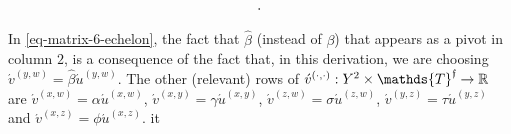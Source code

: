 \documentclass[12pt,a4paper,twoside]{article}
\newcommand{\novel}{\mathfrak f}
\newcommand{\mbbtp}{{\mathds{T}^\novel}}
\newcommand{\xy}{{(x, y)}}
\newcommand{\yz}{{(y,z)}}
\newcommand{\xz}{{(x,z)}}
\newcommand{\xw}{{(x,w)}}
\newcommand{\yw}{{(y,w)}}
\newcommand{\zw}{(z,w)}
\newcommand{\dd}{{(\cdot,\cdot)}}
\begin{document}
\begin{appendices}
\begin{linenomath*}
\begin{equation}
\begin{blockarray}{ccccccc}
    \end{blockarray}.
  \end{equation}
\end{linenomath*}
In \cref{eq-matrix-6-echelon}, the fact that $\hat{\beta}$ (instead of $\beta$)
that appears as a pivot in column $2$, is a consequence of the fact that, in
this derivation, we are choosing $\acute{v}^{\yw} = \hat{\beta}
\acute{u}^{\yw}$.
The other (relevant) rows of $\acute{v}^{\dd}: Y^{2} \times \mbbtp \rightarrow
\R$ are $\acute{v}^{\xw} = \alpha \acute{u}^{\xw}$, $\acute{v}^{\xy} = \gamma
\acute{u}^{\xy}$, $\acute{v}^{\zw}= \sigma\acute{u}^{\zw}$, $\acute{v}^{\yz} =
\tau \acute{u}^{\yz}$ and
$\acute{v}^{\xz} = \phi \acute{u}^{\xz}$.  %
it
\begin{figure}[t]
    \begin{center}
\end{center}
\end{figure}
\end{appendices}
\end{document}
